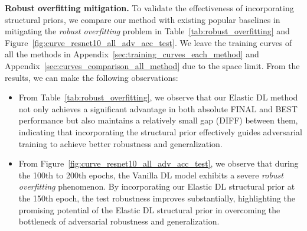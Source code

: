 \textbf{Robust overfitting mitigation.} To validate the effectiveness of incorporating structural priors, we compare our method with existing popular baselines in mitigating the \emph{robust overfitting} problem in  Table~\ref{tab:robust_overfitting} and Figure~\ref{fig:curve_resnet10_all_adv_acc_test}.
We leave  the training curves of all the methods in Appendix~\ref{sec:training_curves_each_method} and Appendix~\ref{sec:curves_comparison_all_method} due to the space limit.   
From the results, we can make the following observations: 
\vspace{-0.1in}
\begin{itemize}[left=0.0em]
    \item From Table~\ref{tab:robust_overfitting}, we observe that our Elastic DL method
    not only achieves a significant advantage in both absolute FINAL and BEST performance but also maintains a relatively small gap (DIFF) between them, indicating that incorporating the structural prior effectively guides adversarial training to achieve better robustness and generalization.
    
    \item From Figure~\ref{fig:curve_resnet10_all_adv_acc_test}, we observe that during the 100th to 200th epochs, the Vanilla DL model exhibits a severe \emph{robust overfitting} phenomenon. By incorporating our Elastic DL structural prior at the 150th epoch, the test robustness improves substantially, highlighting the promising potential of the Elastic DL structural prior in overcoming the bottleneck of adversarial robustness and generalization.
\end{itemize}







